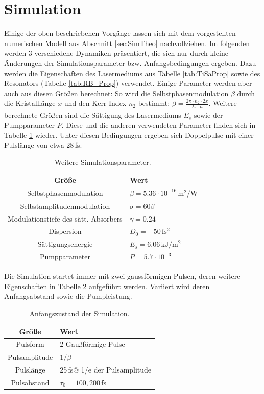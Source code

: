 \documentclass[bachelor,       %
               twoside,        %
               BCOR10mm,       %
               liststotoc,nomtotoc,bibtotoc, %
               english,ngerman, %
               final,          %
               ]{GAUBM}
\begin{document}
\section{Simulation}
\label{sec:SimPrax}
Einige der oben beschriebenen Vorgänge lassen sich mit dem vorgestellten numerischen Modell aus Abschnitt \ref{sec:SimTheo} nachvollziehen.
Im folgenden werden 3 verschiedene Dynamiken präsentiert, die sich nur durch kleine Änderungen der Simulationsparameter bzw. Anfangsbedingungen ergeben.
Dazu werden die Eigenschaften des Lasermediums aus Tabelle \ref{tab:TiSaProp} sowie des Resonators (Tabelle \ref{tab:RB_Prop}) verwendet.
Einige Parameter werden aber auch aus diesen Größen berechnet: 
So wird die Selbstphasenmodulation $\beta$ durch die Kristalllänge $x$ und den Kerr-Index $n_2$ bestimmt: $\beta=\frac{2\pi\cdot n_2\cdot 2x}{\lambda_0\cdot n}$.
Weitere berechnete Größen sind die Sättigung des Lasermediums $E_s$ sowie der Pumpparameter $P$.
Diese und die anderen verwendeten Parameter finden sich in Tabelle \ref{tab:SimParam2} wieder.
Unter diesen Bedingungen ergeben sich Doppelpulse mit einer Pulslänge von etwa 28\,fs.
\begin{table}[!htb]
	\centering
	\begin{tabular}{|c|l|}
		\hline
		Größe & Wert\\
		\hline
		Selbstphasenmodulation & $\beta=5.36\cdot 10^{-16}\,\si{\meter^2\per\watt}$\\
		Selbstamplitudenmodulation & $\sigma=60 \beta$\\
		Modulationstiefe des sätt. Absorbers & $\gamma=0.24$\\
		Dispersion & $D_0=-50\,\si{\femto\second^2}$\\
		Sättigungsenergie & $E_s= 6.06\,\si{\kilo\joule\per\meter^2}$\\
		Pumpparameter & $P=5.7\cdot 10^{-3}$\\
		\hline
	\end{tabular}
	\caption{Weitere Simulationsparameter.}
	\label{tab:SimParam2}
\end{table}

Die Simulation startet immer mit zwei gaussförmigen Pulsen, deren weitere  Eigenschaften in Tabelle \ref{tab:SimParamStart} aufgeführt werden.
Variiert wird deren Anfangsabstand sowie die Pumpleistung.

\begin{table}[!htb]
	\centering
	\begin{tabular}{|c|l|}
		\hline
		Größe & Wert\\
		\hline	
		Pulsform & 2 Gaußförmige Pulse\\
		Pulsamplitude & $1/\beta$\\
		Pulslänge & 25\,fs\quad @ 1/e der Pulsamplitude\\
		Pulsabstand & $\tau_0=100,200\,$fs\\
		\hline
	\end{tabular}
	\caption{Anfangszustand der Simulation.}
	\label{tab:SimParamStart}
\end{table}
\end{document}
